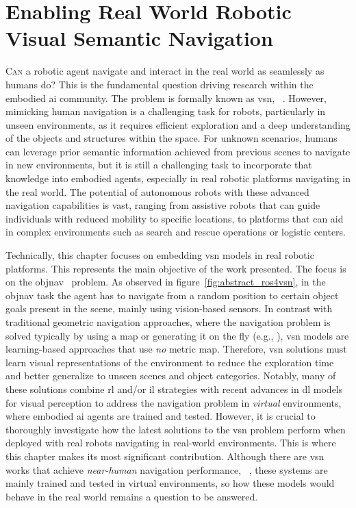 \chapter{Enabling Real World Robotic Visual Semantic Navigation}\label{ch:ros4vsn:-enable-real-world-robotic-visual-semantic-navigation}

\lettrine{\textcolor{accent_color}{C}}{an} a robotic agent navigate and interact in the real world as seamlessly as humans do?
This is the fundamental question driving research within the embodied \acrshort{ai} community.
The problem is formally known as \acrlong{vsn}, \eg~\cite{ramrakhya2023,Cai2024DGMemLV,chang2020}.
However, mimicking human navigation is a challenging task for robots, particularly in unseen environments, as it requires efficient exploration and a deep understanding of the objects and structures within the space.
For unknown scenarios, humans can leverage prior semantic information achieved from previous scenes to navigate in new environments, but it is still a challenging task to incorporate that knowledge into embodied agents, especially in real robotic platforms navigating in the real world.
The potential of autonomous robots with these advanced navigation capabilities is vast, ranging from assistive robots that can guide individuals with reduced mobility to specific locations, to platforms that can aid in complex environments such as search and rescue operations or logistic centers.

Technically, this chapter focuses on embedding \acrshort{vsn} models in real robotic platforms.
This represents the main objective of the work presented.
The focus is on the \acrfull{objnav}~\cite{batra2020} problem.
As observed in figure~\ref{fig:abstract_ros4vsn}, in the \acrshort{objnav} task the agent has to navigate from a random position to certain object goals present in the scene, mainly using vision-based sensors.
In contrast with traditional geometric navigation approaches, where the navigation problem is solved typically by using a map or generating it on the fly (e.g., ), \acrshort{vsn} models are learning-based approaches that use \emph{no} metric map.
Therefore, \acrshort{vsn} solutions must learn visual representations of the environment to reduce the exploration time and better generalize to unseen scenes and object categories.
Notably, many of these solutions combine \acrshort{rl} and/or \acrshort{il} strategies with recent advances in \acrshort{dl} models for visual perception to address the navigation problem in \emph{virtual} environments, where embodied \acrshort{ai} agents are trained and tested.
However, it is crucial to thoroughly investigate how the latest solutions to the \acrshort{vsn} problem perform when deployed with real robots navigating in real-world environments.
This is where this chapter makes its most significant contribution.
Although there are \acrshort{vsn} works that achieve \textit{near-human} navigation performance, \eg~\cite{ramrakhya2023}, these systems are mainly trained and tested in virtual environments, so how these models would behave in the real world remains a question to be answered.

